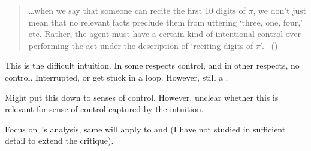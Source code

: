 \begin{note}
\begin{quote}
    \dots when we say that someone can recite the first 10 digits of \(\pi\), we don't just mean that no relevant facts preclude them from uttering `three, one, four,' etc.
    Rather, the agent must have a certain kind of intentional control over performing the act under the description of `reciting digits of \(\pi\)'.%
    \mbox{ }\hfill\mbox{(\citeyear[2]{Schwarz:2020aa})}
  \end{quote}

  This is the difficult intuition.
  In some respects control, and in other respects, no control.
  Interrupted, or get stuck in a loop.
  However, still a \fc{}.

  Might put this down to senses of control.
  However, unclear whether this is relevant for sense of control captured by the intuition.

  Focus on~\cite{Boylan:2020aa}'s analysis, same will apply to \textcite{Mandelkern:2017aa} and \textcite{Schwarz:2020aa} (I have not studied \textcite{Jaster:2020wv} in sufficient detail to extend the critique).
\end{note}

